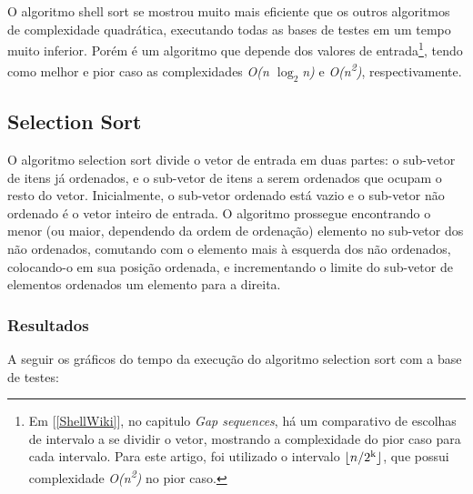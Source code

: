 \documentclass[fleqn,10pt]{SelfArx} %
\begin{document}
{\setlength{\parindent}{-0.5em}
}\newline

O algoritmo shell sort se mostrou muito mais eficiente que os outros algoritmos de complexidade quadrática, executando 
todas as bases de testes em um tempo muito inferior. Porém é um algoritmo que depende dos valores de 
entrada\footnote{Em [\ref{ShellWiki}], no capitulo \emph{Gap sequences}, há um comparativo de escolhas de intervalo a se 
dividir o vetor, mostrando a complexidade do pior caso para cada intervalo. Para este artigo, foi utilizado o 
intervalo $\lfloor n/2\textsuperscript{k} \rfloor$, que possui complexidade \emph{O(n\textsuperscript{2})} no pior caso.},
 tendo como melhor e pior caso as complexidades \emph{O(n $\log_2$n)} e \emph{O(n\textsuperscript{2})}, respectivamente.

\subsection{Selection Sort}

O algoritmo selection sort divide o vetor de entrada em duas partes: o sub-vetor de itens já ordenados, e o sub-vetor de 
itens a serem ordenados que ocupam o resto do vetor. Inicialmente, o sub-vetor ordenado está vazio e o sub-vetor 
não ordenado é o vetor inteiro de entrada. O algoritmo prossegue encontrando o menor (ou maior, dependendo da ordem de 
ordenação) elemento no sub-vetor dos não ordenados, comutando com o elemento mais à esquerda dos não ordenados, colocando-o 
em sua posição ordenada, e incrementando o limite do sub-vetor de elementos ordenados um elemento para a direita.

\subsubsection*{Resultados}

A seguir os gráficos do tempo da execução do algoritmo selection sort com a base de testes:\newline
\end{document}
